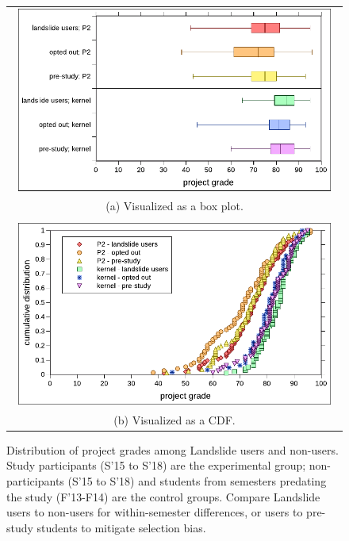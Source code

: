 \begin{figure}[p]
	\begin{center}
	\begin{tabular}{c}
		\includegraphics[width=0.96\textwidth]{photo-of-ze-studence.pdf}
		\\
		(a) Visualized as a box plot.
		\\
		\\
		\includegraphics[width=0.96\textwidth]{photo-of-ze-studence-cdf.pdf}
		\\
		(b) Visualized as a CDF.
	\end{tabular}
	\end{center}
	\caption{Distribution of project grades among Landslide users and non-users.
	Study participants (S'15 to S'18) are the experimental group;
	non-participants (S'15 to S'18)
	and students from semesters predating the study (F'13-F14) are the control groups.
	Compare Landslide users to non-users for within-semester differences,
	or users to pre-study students to mitigate selection bias.}
	\label{fig:photo-of-ze-studence}
\end{figure}

